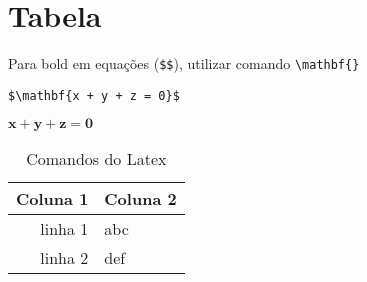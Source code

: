 \documentclass{article}
\begin{document}
\section{Tabela}

Para bold em equações (\verb|$$|), utilizar comando \verb|\mathbf{}|

\verb|$\mathbf{x + y + z = 0}$|

$\mathbf{x + y + z = 0}$

\begin{table}[h!]
    \centering
    \begin{tabular}{||r l||}
        \hline
        \textbf{Coluna} 1 & \textbf{Coluna 2} \\
        \hline
        \hline
        linha 1 & abc \\
        \hline
        linha 2 & def \\
        \hline
    \end{tabular}
    \caption{Comandos do Latex}
    \label{tab:my_label}
\end{table}






















\end{document}
